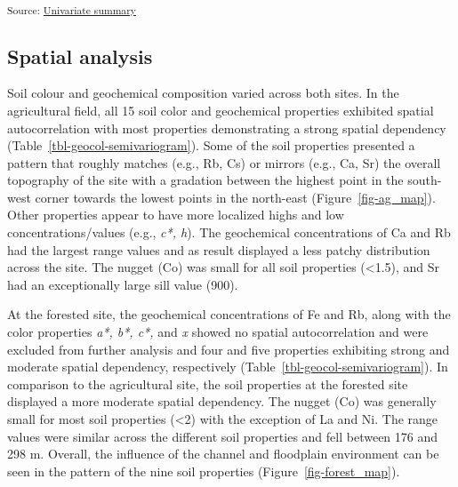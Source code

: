 \documentclass[
  number]{elsarticle}
\begin{document}
\textsubscript{Source:
\href{https://alex-koiter.github.io/spatial-variability-soil-manuscript/notebooks/univariate_summary.qmd.html\#cell-tbl-univariate2-summary}{Univariate
summary}}

\subsection{Spatial analysis}\label{spatial-analysis}

Soil colour and geochemical composition varied across both sites. In the
agricultural field, all 15 soil color and geochemical properties
exhibited spatial autocorrelation with most properties demonstrating a
strong spatial dependency (Table~\ref{tbl-geocol-semivariogram}). Some
of the soil properties presented a pattern that roughly matches (e.g.,
Rb, Cs) or mirrors (e.g., Ca, Sr) the overall topography of the site
with a gradation between the highest point in the south-west corner
towards the lowest points in the north-east (Figure~\ref{fig-ag_map}).
Other properties appear to have more localized highs and low
concentrations/values (e.g., \emph{c*, h}). The geochemical
concentrations of Ca and Rb had the largest range values and as result
displayed a less patchy distribution across the site. The nugget (Co)
was small for all soil properties (\textless1.5), and Sr had an
exceptionally large sill value (900).

At the forested site, the geochemical concentrations of Fe and Rb, along
with the color properties \emph{a*, b*, c*,} and \emph{x} showed no
spatial autocorrelation and were excluded from further analysis and four
and five properties exhibiting strong and moderate spatial dependency,
respectively (Table~\ref{tbl-geocol-semivariogram}). In comparison to
the agricultural site, the soil properties at the forested site
displayed a more moderate spatial dependency. The nugget (Co) was
generally small for most soil properties (\textless2) with the exception
of La and Ni. The range values were similar across the different soil
properties and fell between 176 and 298 m. Overall, the influence of the
channel and floodplain environment can be seen in the pattern of the
nine soil properties (Figure~\ref{fig-forest_map}).
\end{document}
